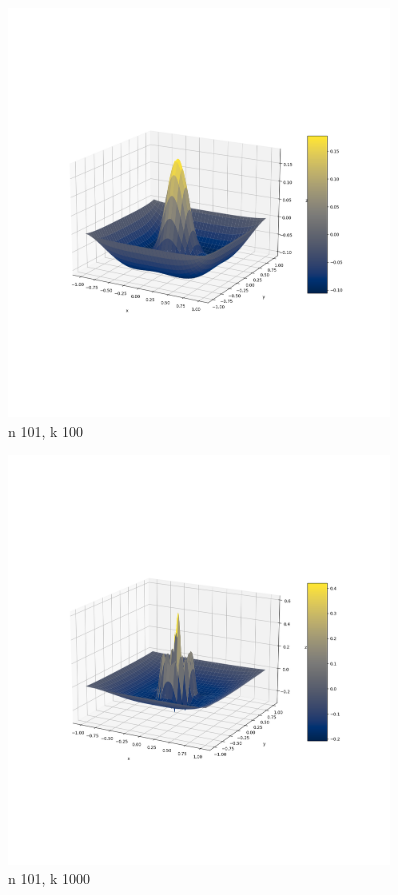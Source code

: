\documentclass{article}
\begin{document}
    \begin{figure}[h!]
        \centering
        \includegraphics[width=0.9\textwidth]{nal1_n101_k100.png}
        \caption{n 101, k 100}
    \end{figure}

    \begin{figure}[h]
        \centering
        \includegraphics[width=0.9\textwidth]{nal1_n101_k1000.png}
        \caption{n 101, k 1000}
    \end{figure}
\end{document}
